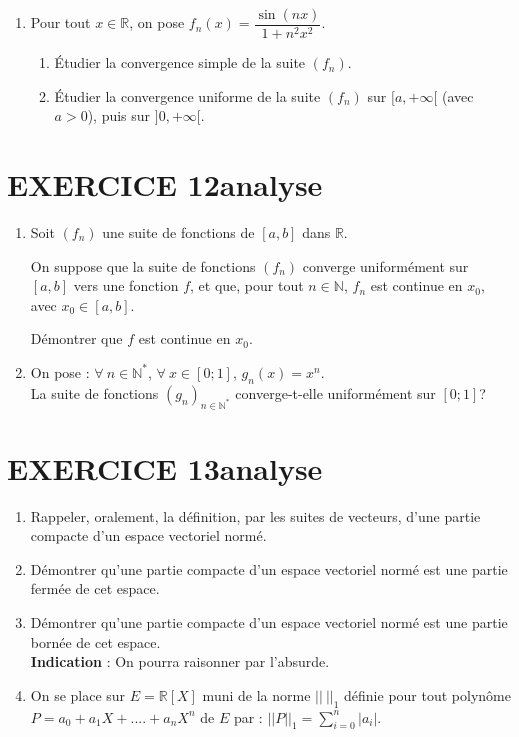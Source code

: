 \documentclass[10pt,oneside]{article}
\begin{document}
\begin{flushleft}
\begin{enumerate}
D\'{e}montrer que la suite de fonctions $\left( f_{n}\right) $ ne converge pas uniform\'{e}ment vers $f$ sur $X$.

\item Pour tout $x\in\mathbb{R}$, on pose $f_{n}(x) =\dfrac{\sin \left( nx\right) }{1+n^{2}x^{2}}$. 
	\begin{enumerate}
	\item \'Etudier la convergence simple de la suite $\left( f_{n}\right)$.
	\item \'Etudier la convergence uniforme de la suite $\left( f_{n}\right)$ sur $[a,+\infty[$ (avec $a>0$),  puis sur $]0,+\infty[$.
	\end{enumerate}
\end{enumerate}




\section*{EXERCICE 12\:analyse }

\begin{enumerate}
\item Soit $(f_n)$ une suite de fonctions de $[a,b]$ dans $\mathbb{R}$.

On suppose que la suite de fonctions $(f_n)$ converge uniformément sur $[a,b]$ vers une fonction $f$, et que, pour tout $n\in\mathbb{N}$, $f_n$ est continue en $x_0$, avec $x_0\in[a,b]$.

Démontrer que $f$ est continue en $x_0$.
\item On pose : $\forall\:n\in\mathbb{N}^*$, $\forall\:x\in[0;1]$, $g_n(x)=x^n$.\\
 La suite de fonctions $(g_n)_{n\in\mathbb{N}^*}$ converge-t-elle uniformément sur $[0;1]$?
\end{enumerate}


\section*{EXERCICE 13\:analyse  }


 \begin{enumerate}
  \item
  Rappeler, oralement, la définition, par les suites de vecteurs, d'une partie compacte d'un espace vectoriel normé.
  \item
  Démontrer qu'une partie compacte d'un espace vectoriel normé est une partie fermée de cet espace.
  \item
  Démontrer qu'une partie compacte d'un espace vectoriel normé est une partie bornée de cet espace.\\
 \textbf{ Indication }: On pourra raisonner par l'absurde.
  \item
  On se place sur $E=\mathbb{R}[X]$ muni de la norme $||\:||_{1}$ définie pour tout polynôme $P=a_0+a_1X+....+a_nX^n$ de $E$  par :
  $||P||_{1}=\displaystyle\sum_{i=0}^{n}|a_{i}|$.
  \begin{enumerate}
  

\end{enumerate}
\end{enumerate}
\end{flushleft}
\end{document}
